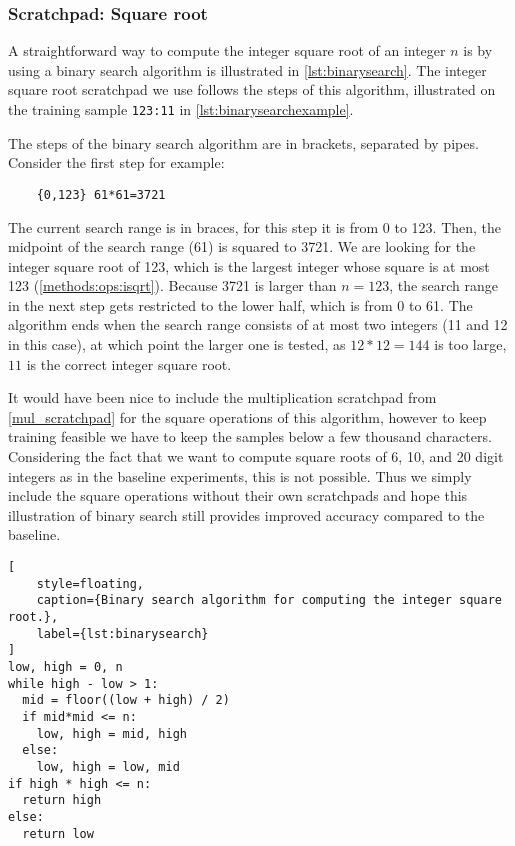 \FloatBarrier
\subsubsection{Scratchpad: Square root}
\label{sqrt_scratchpad}

A straightforward way to compute the integer square root of an integer $n$ is by using a binary search algorithm is illustrated in \cref{lst:binarysearch}.
The integer square root scratchpad we use follows the steps of this algorithm, illustrated on the training sample \verb|123:11| in \cref{lst:binarysearchexample}.

The steps of the binary search algorithm are in brackets, separated by pipes.
Consider the first step for example:
\begin{lstlisting}
	{0,123} 61*61=3721
\end{lstlisting}

The current search range is in braces, for this step it is from 0 to 123.
Then, the midpoint of the search range (61) is squared to 3721.
We are looking for the integer square root of 123, which is the largest integer whose square is at most 123 (\cref{methods:ops:isqrt}). Because 3721 is larger than $n=123$, the search range in the next step gets restricted to the lower half, which is from 0 to 61.
The algorithm ends when the search range consists of at most two integers (11 and 12 in this case), at which point the larger one is tested, as $12*12=144$ is too large, $11$ is the correct integer square root.

It would have been nice to include the multiplication scratchpad from \cref{mul_scratchpad} for the square operations of this algorithm, however to keep training feasible we have to keep the samples below a few thousand characters. Considering the fact that we want to compute square roots of 6, 10, and 20 digit integers as in the baseline experiments, this is not possible.
Thus we simply include the square operations without their own scratchpads and hope this illustration of binary search still provides improved accuracy compared to the baseline.


\begin{lstlisting}[
	style=floating,
	caption={Binary search algorithm for computing the integer square root.},
	label={lst:binarysearch}
]
low, high = 0, n
while high - low > 1:
  mid = floor((low + high) / 2)
  if mid*mid <= n:
    low, high = mid, high
  else:
    low, high = low, mid 
if high * high <= n:
  return high
else:
  return low
\end{lstlisting}




